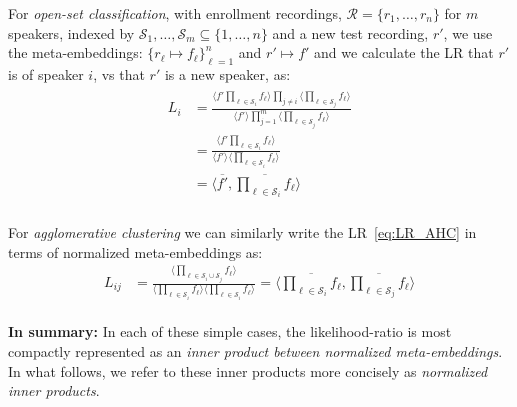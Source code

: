 \documentclass[a4paper,oneside,12pt,english]{report}
\def\expv#1#2{\bigl\langle#1\bigr\rangle_{#2}}
\def\Rset{\mathcal{R}}
\def\Sset{\mathcal{S}}
\def\dot#1#2{\expv{#1,#2}{}}
\def\normal#1{\overline{#1}}
\begin{document}
\noindent For \emph{open-set classification}, with enrollment recordings, $\Rset=\{r_1,\ldots,r_n\}$ for $m$ speakers, indexed by $\Sset_1,\ldots,\Sset_m\subseteq\{1,\ldots,n\}$ and a new test recording, $r'$, we use the meta-embeddings: $\{r_\ell\mapsto f_\ell\}_{\ell=1}^n$ and $r'\mapsto f'$ and we calculate the LR that $r'$ is of speaker $i$, vs that $r'$ is a new speaker, as:
\begin{align}
\label{eq:lropenset}
\begin{split}
L_i &= \frac{\expv{f'\prod_{\ell\in\Sset_i} f_\ell}{}\prod_{j\ne i} \expv{\prod_{\ell\in\Sset_j} f_\ell}{}}
{\expv{f'}{}\prod_{j=1}^m \expv{\prod_{\ell\in\Sset_j} f_\ell}{}} \\
&= \frac{\expv{f'\prod_{\ell\in\Sset_i} f_\ell}{}}
{\expv{f'}{}\expv{\prod_{\ell\in\Sset_i} f_\ell}{}} \\
&= \dot{\normal{f'}}{\normal{\prod_{\ell\in\Sset_i} f_\ell}}
\end{split}
\end{align} \\

\noindent For \emph{agglomerative clustering} we can similarly write the LR~\eqref{eq:LR_AHC} in terms of normalized meta-embeddings as:
\begin{align}
L_{ij} &= \frac{\expv{\prod_{\ell\in\Sset_i\cup\Sset_j}f_\ell}{}}{\expv{\prod_{\ell\in\Sset_i}f_\ell}{}\expv{\prod_{\ell\in\Sset_i}f_\ell}{}} = \dot{\normal{\prod_{\ell\in\Sset_i}f_\ell}}{\normal{\prod_{\ell\in\Sset_j}f_\ell}}
\end{align}\\

\noindent \textbf{In summary:} In each of these simple cases, the likelihood-ratio is most compactly represented as an \emph{inner product between normalized meta-embeddings}. In what follows, we refer to these inner products more concisely as \emph{normalized inner products}. %
\end{document}
